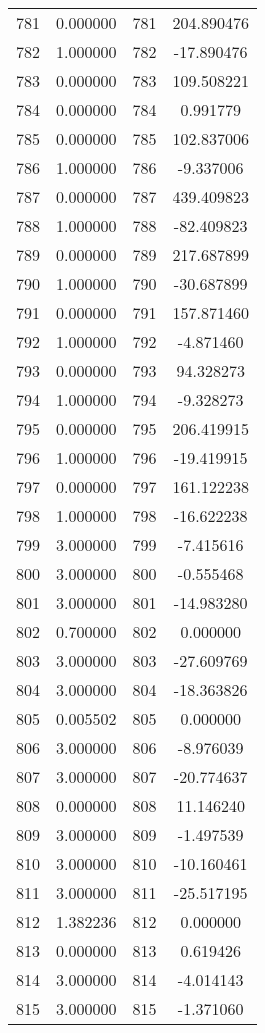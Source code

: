 \documentclass[12pt]{article}
\begin{document}
\begin{longtable}{@{}cccc@{}}
781 & 0.000000 & 781 & 204.890476 \\
782 & 1.000000 & 782 & -17.890476 \\
783 & 0.000000 & 783 & 109.508221 \\
784 & 0.000000 & 784 & 0.991779 \\
785 & 0.000000 & 785 & 102.837006 \\
786 & 1.000000 & 786 & -9.337006 \\
787 & 0.000000 & 787 & 439.409823 \\
788 & 1.000000 & 788 & -82.409823 \\
789 & 0.000000 & 789 & 217.687899 \\
790 & 1.000000 & 790 & -30.687899 \\
791 & 0.000000 & 791 & 157.871460 \\
792 & 1.000000 & 792 & -4.871460 \\
793 & 0.000000 & 793 & 94.328273 \\
794 & 1.000000 & 794 & -9.328273 \\
795 & 0.000000 & 795 & 206.419915 \\
796 & 1.000000 & 796 & -19.419915 \\
797 & 0.000000 & 797 & 161.122238 \\
798 & 1.000000 & 798 & -16.622238 \\
799 & 3.000000 & 799 & -7.415616 \\
800 & 3.000000 & 800 & -0.555468 \\
801 & 3.000000 & 801 & -14.983280 \\
802 & 0.700000 & 802 & 0.000000 \\
803 & 3.000000 & 803 & -27.609769 \\
804 & 3.000000 & 804 & -18.363826 \\
805 & 0.005502 & 805 & 0.000000 \\
806 & 3.000000 & 806 & -8.976039 \\
807 & 3.000000 & 807 & -20.774637 \\
808 & 0.000000 & 808 & 11.146240 \\
809 & 3.000000 & 809 & -1.497539 \\
810 & 3.000000 & 810 & -10.160461 \\
811 & 3.000000 & 811 & -25.517195 \\
812 & 1.382236 & 812 & 0.000000 \\
813 & 0.000000 & 813 & 0.619426 \\
814 & 3.000000 & 814 & -4.014143 \\
815 & 3.000000 & 815 & -1.371060 \\

\end{longtable}
\end{document}
